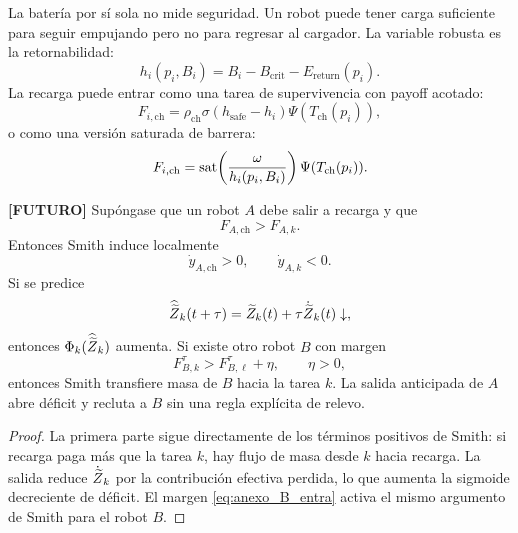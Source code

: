 La batería por sí sola no mide seguridad. Un robot puede tener carga suficiente para
seguir empujando pero no para regresar al cargador. La variable robusta es la
retornabilidad:
\begin{equation}
  h_i(p_i,B_i)=
  B_i-B_{\mathrm{crit}}-E_{\mathrm{return}}(p_i).
  \label{eq:anexo_retornabilidad}
\end{equation}
La recarga puede entrar como una tarea de supervivencia con payoff acotado:
\begin{equation}
  F_{i,\mathrm{ch}}
  =
  \rho_{\mathrm{ch}}
  \sigma(h_{\mathrm{safe}}-h_i)
  \Psi(T_{\mathrm{ch}}(p_i)),
  \label{eq:anexo_payoff_recarga_sigmoidal}
\end{equation}
o como una versión saturada de barrera:
\begin{equation}
  F_{i,\mathrm{ch}}
  =
  \operatorname{sat}\!\left(\frac{\omega}{h_i(p_i,B_i)}\right)
  \Psi(T_{\mathrm{ch}}(p_i)).
  \label{eq:anexo_payoff_recarga_barrera}
\end{equation}

\begin{proposicion}
\textbf{[FUTURO]}
Supóngase que un robot $A$ debe salir a recarga y que
\[
  F_{A,\mathrm{ch}}>F_{A,k}.
  \label{eq:anexo_A_sale}
\]
Entonces Smith induce localmente
\[
  \dot y_{A,\mathrm{ch}}>0,
  \qquad
  \dot y_{A,k}<0.
  \label{eq:anexo_smith_recarga}
\]
Si se predice
\begin{equation}
  \widehat{\widetilde{Z}}_k(t+\tau)
  =
  \widetilde{Z}_k(t)+\tau\dot{\widetilde{Z}}_k(t)
  \downarrow,
  \label{eq:anexo_deficit_anticipado}
\end{equation}
entonces $\Phi_k(\widehat{\widetilde{Z}}_k)$ aumenta. Si existe otro robot $B$ con margen
\begin{equation}
  F_{B,k}^{\tau}>F_{B,\ell}^{\tau}+\eta,
  \qquad \eta>0,
  \label{eq:anexo_B_entra}
\end{equation}
entonces Smith transfiere masa de $B$ hacia la tarea $k$. La salida anticipada de $A$
abre déficit y recluta a $B$ sin una regla explícita de relevo.
\end{proposicion}

\begin{proof}
La primera parte sigue directamente de los términos positivos de Smith: si recarga paga
más que la tarea $k$, hay flujo de masa desde $k$ hacia recarga. La salida reduce
$\dot{\widetilde{Z}}_k$ por la contribución efectiva perdida, lo que aumenta la sigmoide
decreciente de déficit. El margen \eqref{eq:anexo_B_entra} activa el mismo argumento de
Smith para el robot $B$.
\end{proof}

